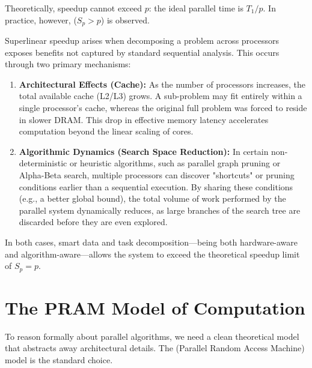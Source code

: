 Theoretically, speedup cannot exceed $p$: the ideal parallel time is $T_1/p$.
In practice, however,  ($S_p > p$) is observed.
\begin{ppnote}
Superlinear speedup arises when decomposing a problem across processors exposes benefits not captured by standard sequential analysis. This occurs through two primary mechanisms:

\begin{enumerate}
    \item \textbf{Architectural Effects (Cache):} As the number of processors increases, the total available cache (L2/L3) grows. A sub-problem may fit entirely within a single processor's cache, whereas the original full problem was forced to reside in slower DRAM. This drop in effective memory latency accelerates computation beyond the linear scaling of cores.
    
    \item \textbf{Algorithmic Dynamics (Search Space Reduction):} In certain non-deterministic or heuristic algorithms, such as parallel graph pruning or Alpha-Beta search, multiple processors can discover "shortcuts" or pruning conditions earlier than a sequential execution. By sharing these conditions (e.g., a better global bound), the total volume of work performed by the parallel system dynamically reduces, as large branches of the search tree are discarded before they are even explored.
\end{enumerate}

In both cases, smart data and task decomposition—being both hardware-aware and algorithm-aware—allows the system to exceed the theoretical speedup limit of $S_p = p$.
\end{ppnote}

\section{The PRAM Model of Computation}

To reason formally about parallel algorithms, we need a clean theoretical
model that abstracts away architectural details. The 
(Parallel Random Access Machine) model is the standard choice.

